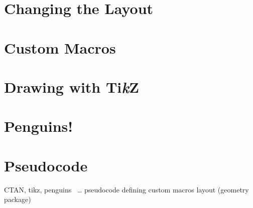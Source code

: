 \section{Changing the Layout}
\begin{frame}

\end{frame}

\section{Custom Macros}
\begin{frame}

\end{frame}

\section{Drawing with Ti\textit{k}Z}
\begin{frame}

\end{frame}

\section{Penguins!}
\begin{frame}

\end{frame}

\section{Pseudocode}
\begin{frame}
   CTAN, tikz, penguins ~\ldots
   pseudocode
   defining custom macros
   layout (geometry package)
\end{frame}